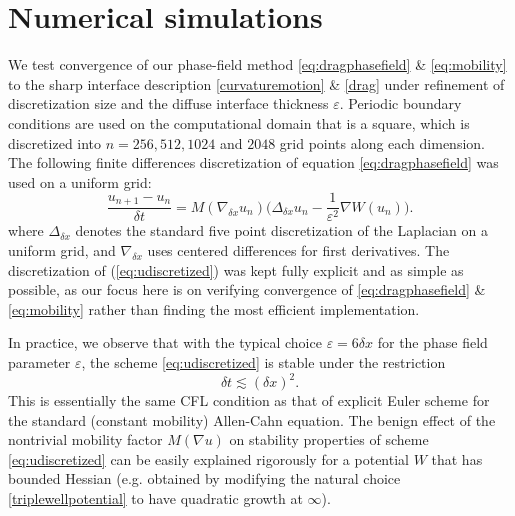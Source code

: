 \documentclass{article}
\theoremstyle{plain}
\theoremstyle{definition}
\theoremstyle{remark}
\newcommand{\eps}{\varepsilon}
\begin{document}
\section{Numerical simulations}
\label{sec:numerics}
We test convergence of our phase-field method \eqref{eq:dragphasefield} \& \eqref{eq:mobility} to the sharp interface description \eqref{curvaturemotion} \& \eqref{drag} under refinement of discretization size and the diffuse interface thickness $\eps$. Periodic boundary conditions are used on the computational domain that is a square, which is discretized into $n=256, 512, 1024$ and $2048$ grid points along each dimension.
The following finite differences discretization of equation \eqref{eq:dragphasefield} was used on a uniform grid:
\begin{equation}\label{eq:udiscretized}
    \frac{u_{n+1} - u_n}{\delta t} = M(\nabla_{\delta x} u_n)\bigg( \Delta_{\delta x} u_n - \frac{1}{\eps^2}\nabla W(u_n) \bigg).
\end{equation}
where $\Delta_{\delta x}$ denotes the standard five point discretization of the Laplacian on a uniform grid, and $\nabla_{\delta x}$ uses centered differences for first derivatives.
The discretization of (\ref{eq:udiscretized}) was kept fully explicit and as simple as possible, as our focus here is on verifying convergence of \eqref{eq:dragphasefield} \& \eqref{eq:mobility} rather than finding the most efficient implementation.

In practice, we observe that with the typical choice $\eps = 6 \delta x$ for the phase field parameter $\eps$, the scheme \eqref{eq:udiscretized} is stable under the restriction
\begin{equation}\label{timestep}
    \delta t \lesssim (\delta x)^2.
\end{equation}
This is essentially the same CFL condition as that of explicit Euler scheme for the standard (constant mobility) Allen-Cahn equation.
The benign effect of the nontrivial mobility factor $M(\nabla u)$ on stability properties of scheme \eqref{eq:udiscretized} can be easily explained rigorously for a potential $W$ that has bounded Hessian (e.g. obtained by modifying the natural choice \eqref{triplewellpotential} to have quadratic growth at $\infty$).
\end{document}
